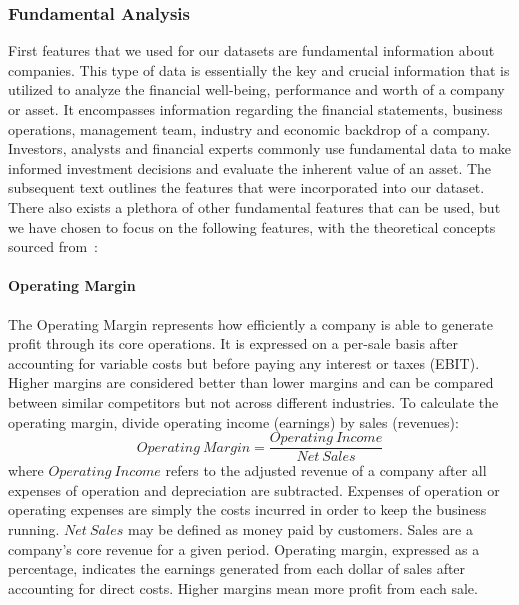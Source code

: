 \documentclass[../xlapes02]{subfiles}
\begin{document}
    \subsubsection{Fundamental Analysis}\label{subsubsec:fundamental-analysis}
    First features that we used for our datasets are fundamental information about companies. This type of data is essentially the key and crucial information that is utilized to analyze the financial well-being, performance and worth of a company or asset. It encompasses information regarding the financial statements, business operations, management team, industry and economic backdrop of a company. Investors, analysts and financial experts commonly use fundamental data to make informed investment decisions and evaluate the inherent value of an asset. The subsequent text outlines the features that were incorporated into our dataset. There also exists a plethora of other fundamental features that can be used, but we have chosen to focus on the following features, with the theoretical concepts sourced from~\cite{investopedia}:

    \paragraph{Operating Margin}\label{par:operating-margin}
    The Operating Margin represents how efficiently a company is able to generate profit through its core operations. It is expressed on a per-sale basis after accounting for variable costs but before paying any interest or taxes (EBIT). Higher margins are considered better than lower margins and can be compared between similar competitors but not across different industries. To calculate the operating margin, divide operating income (earnings) by sales (revenues):
    \begin{equation}
        Operating\ Margin=\frac{Operating\ Income}{Net\ Sales}\label{eq:equation12}
    \end{equation}
    where $Operating\ Income$ refers to the adjusted revenue of a company after all expenses of operation and depreciation are subtracted. Expenses of operation or operating expenses are simply the costs incurred in order to keep the business running. $Net\ Sales$ may be defined as money paid by customers. Sales are a company's core revenue for a given period. Operating margin, expressed as a percentage, indicates the earnings generated from each dollar of sales after accounting for direct costs. Higher margins mean more profit from each sale.
\end{document}
